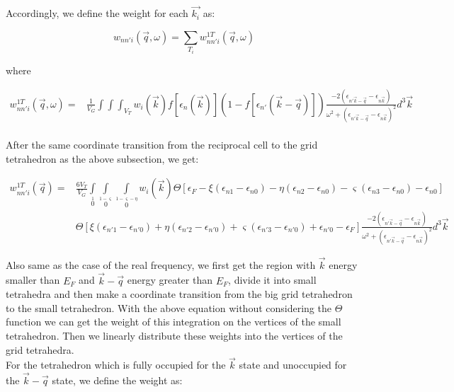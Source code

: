 \documentclass[10pt]{article}
\begin{document}
Accordingly, we define the weight for each $\vec{k_i}$ as:

\begin{equation}
w_{nn'i}(\vec{q},\omega)=\sum\limits_{T_i}w_{nn'i}^{1T}(\vec{q},\omega)
\label{wtofkiimag}
\end{equation} 

where

\begin{eqnarray}\label{wtofkiTimag}
{w_{nn'i}^{1T}}(\vec{q},\omega)=&\frac{1}{V_G}
\int\int\int_{V_T}w_i(\vec{k})f[\epsilon_n(\vec{k})](1-f[\epsilon_{n'}(\vec{k}-\vec{q})])\frac{-2(\epsilon_{n'\vec{k}-\vec{q}}-\epsilon_{n\vec{k}})}{\omega^2+(\epsilon_{n'\vec{k}-\vec{q}}-\epsilon_{n\vec{k}})^2}d^3\vec{k}	
\end{eqnarray}\\

After the same coordinate transition from the reciprocal cell to the grid tetrahedron as the above subsection, we get:

\begin{eqnarray}\label{wtofkiT2imag}
{w_{nn'i}^{1T}}(\vec{q})=&\frac{6V_T}{V_G}
\int\limits_0\limits^1\int\limits_0\limits^{1-\varsigma}\int\limits_0\limits^{1-\varsigma-\eta}w_i(\vec{k})\Theta[\epsilon_F-\xi(\epsilon_{n1}-\epsilon_{n0})-\eta(\epsilon_{n2}-\epsilon_{n0})-\varsigma(\epsilon_{n3}-
\epsilon_{n0})-\epsilon_{n0}]\nonumber\\
&\Theta[\xi(\epsilon_{n'1}-\epsilon_{n'0})+\eta(\epsilon_{n'2}-\epsilon_{n'0})+\varsigma(\epsilon_{n'3}-\epsilon_{n'0})+\epsilon_{n'0}-\epsilon_F] \frac{-2(\epsilon_{n'\vec{k}-\vec{q}}-\epsilon_{n\vec{k}})}{\omega^2+(\epsilon_{n'\vec{k}-\vec{q}}-\epsilon_{n\vec{k}})^2}d^3\vec{k}	
\end{eqnarray}

Also same as the case of the real frequency, we first get the region with $\vec{k}$ energy smaller than $E_F$ and $\vec{k}-\vec{q}$ energy greater than $E_F$, divide it into small tetrahedra and then make a coordinate transition from the big grid tetrahedron to the small tetrahedron. With the above equation without considering the $\Theta$ function we can get the weight of this integration on the vertices of the small tetrahedron. Then we linearly distribute these weights into the vertices of the grid tetrahedra. \\

For the tetrahedron which is fully occupied for the $\vec{k}$ state and unoccupied for the $\vec{k}-\vec{q}$ state, we define the weight as:
\end{document}
